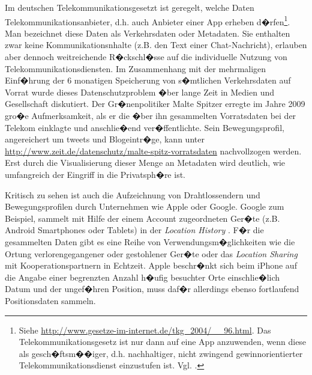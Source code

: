 Im deutschen Telekommunikationsgesetzt ist geregelt, welche Daten Telekommunikationsanbieter, d.h. auch Anbieter einer App erheben d�rfen\footnote{Siehe \url{http://www.gesetze-im-internet.de/tkg_2004/__96.html}. Das Telekommunikationsgesetz ist nur dann auf eine App anzuwenden, wenn diese als gesch�ftsm��iger, d.h. nachhaltiger, nicht zwingend gewinnorientierter Telekommunikationsdienst einzustufen ist. Vgl. \cite{Solmecke2014}.}. Man bezeichnet diese Daten als Verkehrsdaten oder Metadaten. Sie enthalten zwar keine Kommunikationsnhalte (z.B. den Text einer Chat-Nachricht), erlauben aber dennoch weitreichende R�ckschl�sse auf die individuelle Nutzung von Telekommunikationsdiensten. Im Zusammenhang mit der mehrmaligen Einf�hrung der 6 monatigen Speicherung von s�mtlichen Verkehrsdaten auf Vorrat wurde dieses Datenschutzproblem �ber lange Zeit in Medien und Gesellschaft diskutiert. Der Gr�nenpolitiker Malte Spitzer erregte im Jahre 2009 gro�e Aufmerksamkeit, als er die �ber ihn gesammelten Vorratsdaten bei der Telekom einklagte und anschlie�end ver�ffentlichte. Sein Bewegungsprofil, 
angereichert um tweets und Blogeintr�ge, kann unter \url{http://www.zeit.de/datenschutz/malte-spitz-vorratsdaten} nachvollzogen werden. Erst durch die Visualisierung dieser Menge an Metadaten wird deutlich, wie umfangreich der Eingriff in die Privatsph�re ist.

Kritisch zu sehen ist auch die Aufzeichnung von Drahtlossendern und Bewegungsprofilen durch Unternehmen wie Apple oder Google. Google zum Beispiel, sammelt mit Hilfe der einem Account zugeordneten Ger�te (z.B. Android Smartphones oder Tablets)  in der \textit{Location History} \cite{Dhein2017}. F�r die gesammelten Daten gibt es eine Reihe von Verwendungsm�glichkeiten wie die Ortung verlorengegangener oder gestohlener Ger�te oder das \textit{Location Sharing} mit Kooperationspartnern in Echtzeit. Apple beschr�nkt sich beim iPhone auf die Angabe einer begrenzten Anzahl h�ufig besuchter Orte einschlie�lich Datum und der ungef�hren Position, muss daf�r allerdings ebenso fortlaufend Positionsdaten sammeln. 

